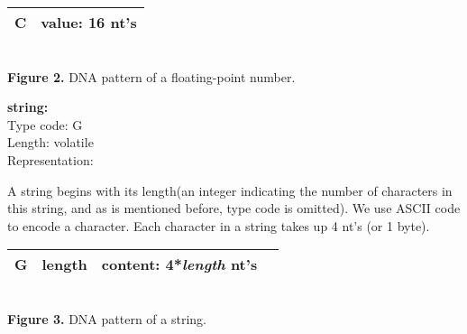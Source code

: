 \documentclass{article}
\begin{document}
%

\begin{center}
    \begin{tabular}{|c|c|}
        \hline
        C & value: 16 nt's \\
        \hline
    \end{tabular}
    \\[3pt]{\small \textbf{Figure 2.} DNA pattern of a floating-point number.}
\end{center}
\textbf{string:}\\
Type code: G\\
Length: volatile\\
Representation:
\par A string begins with its length(an integer indicating the number of characters in this string, and as is mentioned before, type code is omitted). We use ASCII code to encode a character. Each character in a string takes up 4 nt's (or 1 byte). 
\begin{center}
    \begin{tabular}{|c|c|c|c|}
        \hline
        G & length & content: 4*\textit{length} nt's \\
        \hline
    \end{tabular}
    \\[3pt]{\small \textbf{Figure 3.} DNA pattern of a string.}
\end{center}
\end{document}
